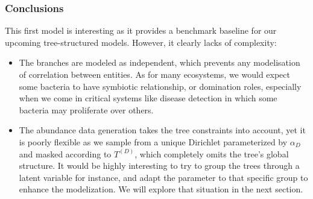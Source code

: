 \subsubsection{Conclusions}

This first model is interesting as it provides a benchmark baseline for our upcoming tree-structured models.
However, it clearly lacks of complexity:
\begin{itemize}
    \item The branches are modeled as independent, which prevents any modelisation of correlation between entities.
          As for many ecosystems, we would expect some bacteria to have symbiotic relationship, or domination roles,
          especially when we come in critical systems like disease detection in which some bacteria may proliferate over others.
    \item The abundance data generation takes the tree constraints into account, yet it is poorly flexible as we sample from a unique Dirichlet
          parameterized by $\alpha_D$ and masked according to $T^{(D)}$, which completely omits the tree's global structure.
          It would be highly interesting to try to group the trees through a latent variable for instance, and adapt the parameter
          to that specific group to enhance the modelization.
          We will explore that situation in the next section.
\end{itemize}